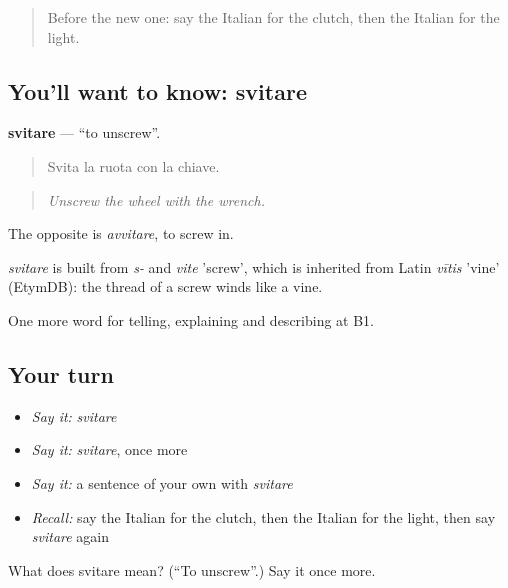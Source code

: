 \label{lesson:IT-C411-svitare}



\begin{quote}
Before the new one: say the Italian for the clutch, then the Italian for the light.
\end{quote}

\subsection*{You'll want to know: svitare}
\textbf{svitare} — \textquotedblleft{}to unscrew\textquotedblright{}.

\begin{quote}
Svita la ruota con la chiave.
\end{quote}

\begin{quote}
\emph{Unscrew the wheel with the wrench.}
\end{quote}

The opposite is \emph{avvitare}, to screw in.

\begin{cousinweb}
\emph{svitare} is built from \emph{s-} and \emph{vite} 'screw', which is inherited from Latin \emph{vītis} 'vine' (EtymDB): the thread of a screw winds like a vine.
\end{cousinweb}

\begin{grammarlens}[title={What you've built}]
One more word for telling, explaining and describing at B1.
\end{grammarlens}

\subsection*{Your turn}
\begin{itemize}
\raggedright
  \item \emph{Say it:} \emph{svitare}
  \item \emph{Say it:} \emph{svitare}, once more
  \item \emph{Say it:} a sentence of your own with \emph{svitare}
  \item \emph{Recall:} say the Italian for the clutch, then the Italian for the light, then say \emph{svitare} again
\end{itemize}

\begin{tcolorbox}[breakable,colback=teal!4,colframe=teal!35!black,title={Before you move on}]
What does svitare mean? (\textquotedblleft{}To unscrew\textquotedblright{}.) Say it once more.
\end{tcolorbox}
